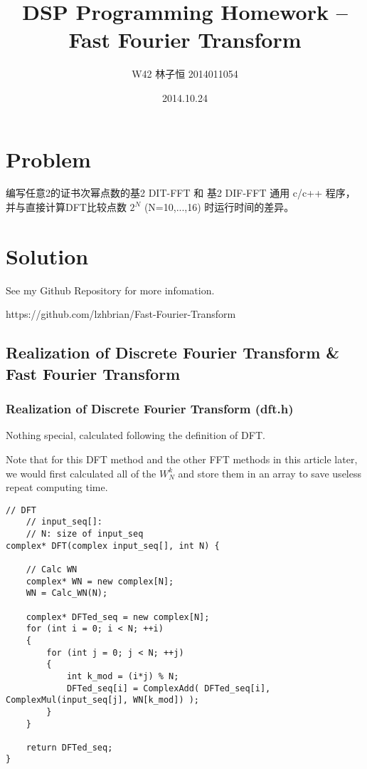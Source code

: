 \documentclass[UTF8,a4paper]{ctexart}
\author{W42 林子恒 2014011054}
\title{DSP Programming Homework -- Fast Fourier Transform}
\date{2014.10.24}
\begin{document}
  \maketitle
  \thispagestyle{empty}

\tableofcontents

\newpage


\section{Problem}

编写任意2的证书次幂点数的基2 DIT-FFT 和 基2 DIF-FFT 通用 c/c++ 程序，并与直接计算DFT比较点数 $2^{N}$ (N=10,...,16) 时运行时间的差异。


\section{Solution}

	See my Github Repository for more infomation.
	
	https://github.com/lzhbrian/Fast-Fourier-Transform
	

\subsection{Realization of Discrete Fourier Transform \& Fast Fourier Transform}

\subsubsection{Realization of Discrete Fourier Transform (dft.h)}

Nothing special, calculated following the definition of DFT.

Note that for this DFT method and the other FFT methods in this article later, we would first calculated all of the $W^{k}_{N}$ and store them in an array to save useless repeat computing time.

    \begin{lstlisting}
// DFT
	// input_seq[]: 
	// N: size of input_seq
complex* DFT(complex input_seq[], int N) {

	// Calc WN
	complex* WN = new complex[N];
	WN = Calc_WN(N);

	complex* DFTed_seq = new complex[N];
	for (int i = 0; i < N; ++i)
	{
		for (int j = 0; j < N; ++j)
		{
			int k_mod = (i*j) % N;
			DFTed_seq[i] = ComplexAdd( DFTed_seq[i], ComplexMul(input_seq[j], WN[k_mod]) );
		}
	}

	return DFTed_seq;
}
    \end{lstlisting}
\end{document}

